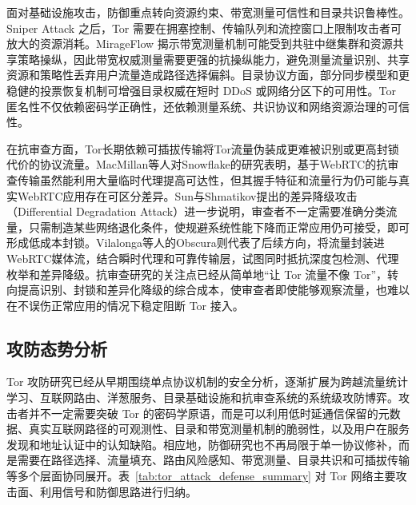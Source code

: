 面对基础设施攻击，防御重点转向资源约束、带宽测量可信性和目录共识鲁棒性。Sniper Attack 之后，Tor 需要在拥塞控制、传输队列和流控窗口上限制攻击者可放大的资源消耗\cite{jansen2014sniper}。MirageFlow 揭示带宽测量机制可能受到共驻中继集群和资源共享策略操纵，因此带宽权威测量需要更强的抗操纵能力，避免测量流量识别、共享资源和策略性丢弃用户流量造成路径选择偏斜\cite{sendner2024mirageflow}。目录协议方面，部分同步模型和更稳健的投票恢复机制可增强目录权威在短时 DDoS 或网络分区下的可用性\cite{luo2026five}。Tor 匿名性不仅依赖密码学正确性，还依赖测量系统、共识协议和网络资源治理的可信性。

在抗审查方面，Tor长期依赖可插拔传输将Tor流量伪装成更难被识别或更高封锁代价的协议流量。MacMillan等人对Snowflake的研究表明，基于WebRTC的抗审查传输虽然能利用大量临时代理提高可达性，但其握手特征和流量行为仍可能与真实WebRTC应用存在可区分差异\cite{macmillan2020evaluating}。Sun与Shmatikov提出的差异降级攻击（Differential Degradation Attack）进一步说明，审查者不一定需要准确分类流量，只需制造某些网络退化条件，使规避系统性能下降而正常应用仍可接受，即可形成低成本封锁\cite{sun2024differential}。Vilalonga等人的Obscura则代表了后续方向，将流量封装进WebRTC媒体流，结合瞬时代理和可靠传输层，试图同时抵抗深度包检测、代理枚举和差异降级\cite{vilalonga2026obscura}。抗审查研究的关注点已经从简单地``让 Tor 流量不像 Tor''，转向提高识别、封锁和差异化降级的综合成本，使审查者即使能够观察流量，也难以在不误伤正常应用的情况下稳定阻断 Tor 接入。

\subsection{攻防态势分析}

Tor 攻防研究已经从早期围绕单点协议机制的安全分析，逐渐扩展为跨越流量统计学习、互联网路由、洋葱服务、目录基础设施和抗审查系统的系统级攻防博弈。攻击者并不一定需要突破 Tor 的密码学原语，而是可以利用低时延通信保留的元数据、真实互联网路径的可观测性、目录和带宽测量机制的脆弱性，以及用户在服务发现和地址认证中的认知缺陷。相应地，防御研究也不再局限于单一协议修补，而是需要在路径选择、流量填充、路由风险感知、带宽测量、目录共识和可插拔传输等多个层面协同展开。表~\ref{tab:tor_attack_defense_summary} 对 Tor 网络主要攻击面、利用信号和防御思路进行归纳。

